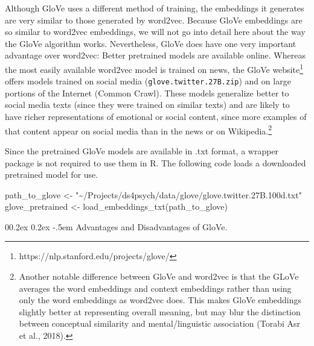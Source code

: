 \documentclass[
  man,
  floatsintext,
  longtable,
  nolmodern,
  notxfonts,
  notimes,
  colorlinks=true,linkcolor=blue,citecolor=blue,urlcolor=blue]{apa7}
\makeatletter
\renewcommand{\paragraph}{\@startsection{paragraph}{4}{\parindent}%
	{0\baselineskip \@plus 0.2ex \@minus 0.2ex}%
	{-.5em}%
	{\normalfont\normalsize\bfseries\typesectitle}}
\newenvironment{Shaded}{\begin{snugshade}}{\end{snugshade}}
\newcommand{\FunctionTok}[1]{\textcolor[rgb]{0.28,0.35,0.67}{#1}}
\newcommand{\NormalTok}[1]{\textcolor[rgb]{0.00,0.23,0.31}{#1}}
\newcommand{\OtherTok}[1]{\textcolor[rgb]{0.00,0.23,0.31}{#1}}
\newcommand{\StringTok}[1]{\textcolor[rgb]{0.13,0.47,0.30}{#1}}
\makeatother
\begin{document}
Although GloVe uses a different method of training, the embeddings it
generates are very similar to those generated by word2vec. Because GloVe
embeddings are so similar to word2vec embeddings, we will not go into
detail here about the way the GloVe algorithm works. Nevertheless, GloVe
does have one very important advantage over word2vec: Better pretrained
models are available online. Whereas the most easily available word2vec
model is trained on news, the GloVe website\footnote{https://nlp.stanford.edu/projects/glove/}
offers models trained on social media (\texttt{glove.twitter.27B.zip})
and on large portions of the Internet (Common Crawl). These models
generalize better to social media texts (since they were trained on
similar texts) and are likely to have richer representations of
emotional or social content, since more examples of that content appear
on social media than in the news or on Wikipedia.\footnote{Another
  notable difference between GloVe and word2vec is that the GLoVe
  averages the word embeddings and context embeddings rather than using
  only the word embeddings as word2vec does. This makes GloVe embeddings
  slightly better at representing overall meaning, but may blur the
  distinction between conceptual similarity and mental/linguistic
  association (Torabi Asr et al., 2018).}

Since the pretrained GloVe models are available in .txt format, a
wrapper package is not required to use them in R. The following code
loads a downloaded pretrained model for use.

\begin{Shaded}
\begin{Highlighting}[]
\NormalTok{path\_to\_glove }\OtherTok{\textless{}{-}} \StringTok{"\textasciitilde{}/Projects/ds4psych/data/glove/glove.twitter.27B.100d.txt"}
\NormalTok{glove\_pretrained }\OtherTok{\textless{}{-}} \FunctionTok{load\_embeddings\_txt}\NormalTok{(path\_to\_glove)}
\end{Highlighting}
\end{Shaded}

\paragraph{Advantages and Disadvantages of
GloVe.}\label{advantages-and-disadvantages-of-glove}
\end{document}
